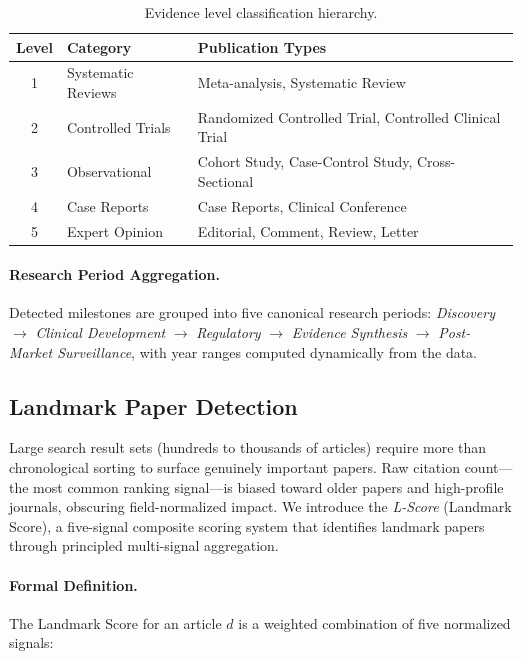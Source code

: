 \documentclass[11pt,a4paper]{article}
\newcommand{\lscore}{\textit{L-Score}}
\begin{document}
\begin{table}[htbp]
\centering
\caption{Evidence level classification hierarchy.}
\label{tab:evidence_levels}
\begin{tabular}{clp{5cm}}
\toprule
\textbf{Level} & \textbf{Category} & \textbf{Publication Types} \\
\midrule
1 & Systematic Reviews & Meta-analysis, Systematic Review \\
2 & Controlled Trials  & Randomized Controlled Trial, Controlled Clinical Trial \\
3 & Observational      & Cohort Study, Case-Control Study, Cross-Sectional \\
4 & Case Reports       & Case Reports, Clinical Conference \\
5 & Expert Opinion     & Editorial, Comment, Review, Letter \\
\bottomrule
\end{tabular}
\end{table}

\paragraph{Research Period Aggregation.}
Detected milestones are grouped into five canonical research periods: \emph{Discovery} $\rightarrow$ \emph{Clinical Development} $\rightarrow$ \emph{Regulatory} $\rightarrow$ \emph{Evidence Synthesis} $\rightarrow$ \emph{Post-Market Surveillance}, with year ranges computed dynamically from the data.

\subsection{Landmark Paper Detection}
\label{sec:landmark}

Large search result sets (hundreds to thousands of articles) require more than chronological sorting to surface genuinely important papers.
Raw citation count---the most common ranking signal---is biased toward older papers and high-profile journals, obscuring field-normalized impact.
We introduce the \lscore{} (Landmark Score), a five-signal composite scoring system that identifies landmark papers through principled multi-signal aggregation.

\paragraph{Formal Definition.}
The Landmark Score for an article $d$ is a weighted combination of five normalized signals:
\end{document}
